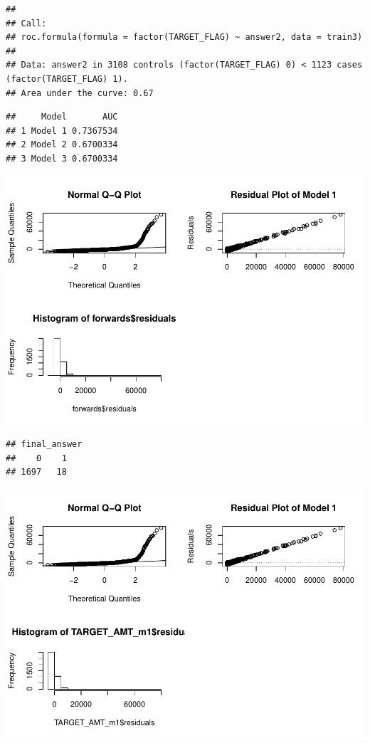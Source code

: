 \documentclass[]{article}
\begin{document}
\begin{verbatim}
## 
## Call:
## roc.formula(formula = factor(TARGET_FLAG) ~ answer2, data = train3)
## 
## Data: answer2 in 3108 controls (factor(TARGET_FLAG) 0) < 1123 cases (factor(TARGET_FLAG) 1).
## Area under the curve: 0.67
\end{verbatim}

\begin{verbatim}
##     Model       AUC
## 1 Model 1 0.7367534
## 2 Model 2 0.6700334
## 3 Model 3 0.6700334
\end{verbatim}

\includegraphics{DATA621-Homework-4_files/figure-latex/unnamed-chunk-34-8.pdf}

\begin{verbatim}
## final_answer
##    0    1 
## 1697   18
\end{verbatim}

\includegraphics{DATA621-Homework-4_files/figure-latex/unnamed-chunk-35-1.pdf}
\end{document}
